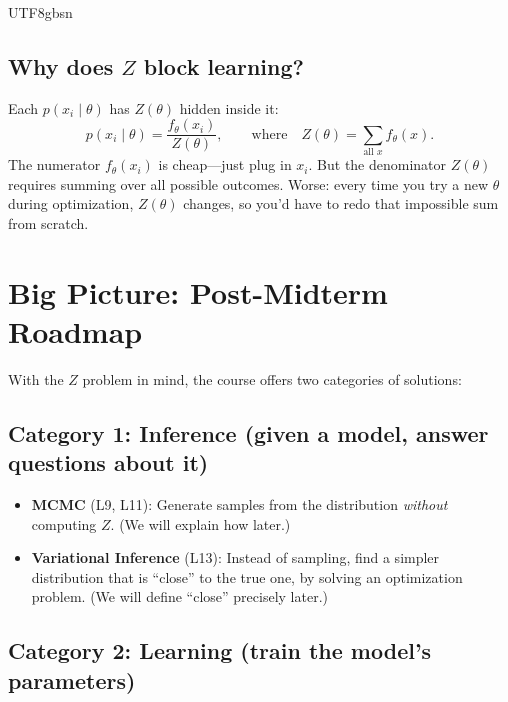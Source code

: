 \documentclass[11pt]{article}
\begin{document}
\begin{CJK}{UTF8}{gbsn}
\subsection*{Why does $Z$ block learning?}

Each $p(x_i \mid \theta)$ has $Z(\theta)$ hidden inside it:
\[
  p(x_i \mid \theta) = \frac{f_\theta(x_i)}{Z(\theta)},
  \qquad \text{where} \quad
  Z(\theta) = \sum_{\text{all } x} f_\theta(x).
\]
The numerator $f_\theta(x_i)$ is cheap---just plug in $x_i$. But the denominator $Z(\theta)$ requires summing over all possible outcomes. Worse: every time you try a new $\theta$ during optimization, $Z(\theta)$ changes, so you'd have to redo that impossible sum from scratch.

\vspace{0.5em}
\noindent{}

\section*{Big Picture: Post-Midterm Roadmap}

With the $Z$ problem in mind, the course offers two categories of solutions:

\subsection*{Category 1: Inference (given a model, answer questions about it)}

\begin{itemize}
  \item \textbf{MCMC} (L9, L11): Generate samples from the distribution \emph{without} computing $Z$. (We will explain how later.)
  \item \textbf{Variational Inference} (L13): Instead of sampling, find a simpler distribution that is ``close'' to the true one, by solving an optimization problem. (We will define ``close'' precisely later.)
\end{itemize}

\subsection*{Category 2: Learning (train the model's parameters)}


\end{CJK}
\end{document}
